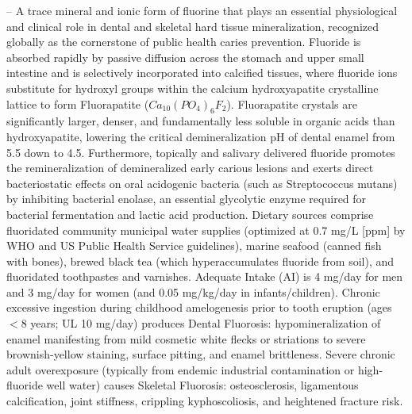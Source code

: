 -- A trace mineral and ionic form of fluorine that plays an essential physiological and clinical role in dental and skeletal hard tissue mineralization, recognized globally as the cornerstone of public health caries prevention. Fluoride is absorbed rapidly by passive diffusion across the stomach and upper small intestine and is selectively incorporated into calcified tissues, where fluoride ions substitute for hydroxyl groups within the calcium hydroxyapatite crystalline lattice to form Fluorapatite ($Ca_{10}(PO_4)_6F_2$). Fluorapatite crystals are significantly larger, denser, and fundamentally less soluble in organic acids than hydroxyapatite, lowering the critical demineralization pH of dental enamel from 5.5 down to 4.5. Furthermore, topically and salivary delivered fluoride promotes the remineralization of demineralized early carious lesions and exerts direct bacteriostatic effects on oral acidogenic bacteria (such as Streptococcus mutans) by inhibiting bacterial enolase, an essential glycolytic enzyme required for bacterial fermentation and lactic acid production. Dietary sources comprise fluoridated community municipal water supplies (optimized at 0.7 mg/L [ppm] by WHO and US Public Health Service guidelines), marine seafood (canned fish with bones), brewed black tea (which hyperaccumulates fluoride from soil), and fluoridated toothpastes and varnishes. Adequate Intake (AI) is 4 mg/day for men and 3 mg/day for women (and 0.05 mg/kg/day in infants/children). Chronic excessive ingestion during childhood amelogenesis prior to tooth eruption (ages $<8$ years; UL 10 mg/day) produces Dental Fluorosis: hypomineralization of enamel manifesting from mild cosmetic white flecks or striations to severe brownish-yellow staining, surface pitting, and enamel brittleness. Severe chronic adult overexposure (typically from endemic industrial contamination or high-fluoride well water) causes Skeletal Fluorosis: osteosclerosis, ligamentous calcification, joint stiffness, crippling kyphoscoliosis, and heightened fracture risk.

